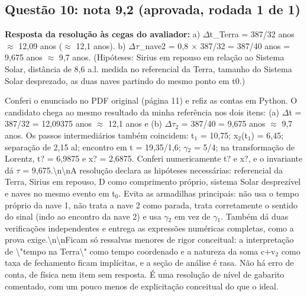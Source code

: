 \documentclass{article}%
\begin{document}
\subsection*{Questão 10: nota 9,2 (aprovada, rodada 1 de 1)}%
\textbf{Resposta da resolução às cegas do avaliador:} a) $\Delta$t\_Terra = 387/32 anos $\approx$ 12,09 anos ($\approx$ 12,1 anos).\newline%
b) $\Delta$$\tau$\_nave2 = 0,8 $\times$ 387/32 = 387/40 anos = 9,675 anos $\approx$ 9,7 anos.\newline%
(Hipóteses: Sirius em repouso em relação ao Sistema Solar, distância de 8,6 a.l. medida no referencial da Terra, tamanho do Sistema Solar desprezado, as duas naves partindo do mesmo ponto em t0.)\par %
Conferi o enunciado no PDF original (página 11) e refiz as contas em Python. O candidato chega ao mesmo resultado da minha referência nos dois itens: (a) $\Delta$t = 387/32 = 12,09375 anos $\approx$ 12,1 anos e (b) $\Delta$$\tau$$_{2}$ = 387/40 = 9,675 anos $\approx$ 9,7 anos. Os passos intermediários também coincidem: t$_{1}$ = 10,75; x$_{2}$(t$_{1}$) = 6,45; separação de 2,15 al; encontro em t = 19,35/1,6; $\gamma$$_{2}$ = 5/4; na transformação de Lorentz, t? = 6,9875 e x? = 2,6875. Conferi numericamente t? e x?, e o invariante dá $\tau$ = 9,675.\textbackslash{}n\textbackslash{}nA resolução declara as hipóteses necessárias: referencial da Terra, Sirius em repouso, D como comprimento próprio, sistema Solar desprezível e naves no mesmo evento em t$_{0}$. Evita as armadilhas principais: não usa o tempo próprio da nave 1, não trata a nave 2 como parada, trata corretamente o sentido do sinal (indo ao encontro da nave 2) e usa $\gamma$$_{2}$ em vez de $\gamma$$_{1}$. Também dá duas verificações independentes e entrega as expressões numéricas completas, como a prova exige.\textbackslash{}n\textbackslash{}nFicam só ressalvas menores de rigor conceitual: a interpretação de \textbackslash{}"tempo na Terra\textbackslash{}" como tempo coordenado e a natureza da soma c+v$_{2}$ como taxa de fechamento ficam implícitas, e a seção de análise é rasa. Não há erro de conta, de física nem item sem resposta. É uma resolução de nível de gabarito comentado, com um pouco menos de explicitação conceitual do que o ideal.%
\end{document}
